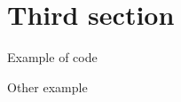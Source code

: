 \section{Third section}

\begin{frame}{Example of code}
\end{frame}

\begin{frame}{Other example}
	\centering %
\end{frame}
